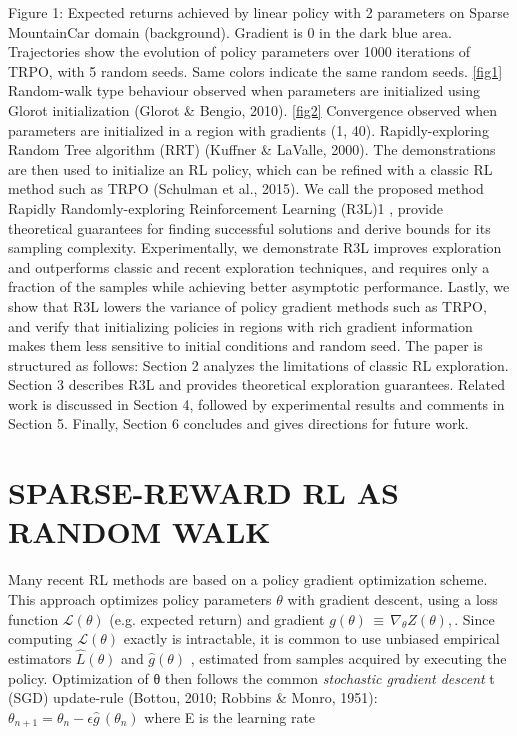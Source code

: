 \documentclass{article}
\begin{document}
Figure 1: Expected returns achieved by linear policy with 2 parameters on Sparse MountainCar
domain (background). Gradient is 0 in the dark blue area. Trajectories show the evolution of policy
parameters over 1000 iterations of TRPO, with 5 random seeds. Same colors indicate the same
random seeds. \ref{fig1} Random-walk type behaviour observed when parameters are initialized using
Glorot initialization (Glorot \& Bengio, 2010). \ref{fig2} Convergence observed when parameters are
initialized in a region with gradients (1, 40).
Rapidly-exploring Random Tree algorithm (RRT) (Kuffner & LaValle, 2000). The demonstrations
are then used to initialize an RL policy, which can be refined with a classic RL method such
as TRPO (Schulman et al., 2015). We call the proposed method Rapidly Randomly-exploring
Reinforcement Learning (R3L)1
, provide theoretical guarantees for finding successful solutions
and derive bounds for its sampling complexity. Experimentally, we demonstrate R3L improves
exploration and outperforms classic and recent exploration techniques, and requires only a fraction of
the samples while achieving better asymptotic performance. Lastly, we show that R3L lowers the
variance of policy gradient methods such as TRPO, and verify that initializing policies in regions
with rich gradient information makes them less sensitive to initial conditions and random seed.
The paper is structured as follows: Section 2 analyzes the limitations of classic RL exploration.
Section 3 describes R3L and provides theoretical exploration guarantees. Related work is discussed in
Section 4, followed by experimental results and comments in Section 5. Finally, Section 6 concludes
and gives directions for future work.

\section{ SPARSE-REWARD RL AS RANDOM WALK}
Many recent RL methods are based on a policy gradient optimization scheme. This approach
optimizes policy parameters $\theta$ with gradient descent, using a loss function ${\mathcal{L}}(\theta)$  (e.g. expected return)
and gradient $g(\theta)\,\equiv\,\nabla_{\theta}Z(\theta), $. Since computing  ${\mathcal{L}}(\theta)$ exactly is intractable, it is common to use
unbiased empirical estimators ${\hat{L}}(\theta) $  and ${\hat{g}}(\theta) $ , estimated from samples acquired by executing the policy.
Optimization of θ then follows the common \textit{stochastic gradient descent} t (SGD) update-rule (Bottou,
2010; Robbins \& Monro, 1951): 
$
\theta_{n+1}=\theta_{n}-\epsilon{\hat{g}}\,(\theta_{n}) 
$ where E is the learning rate
\end{document}
